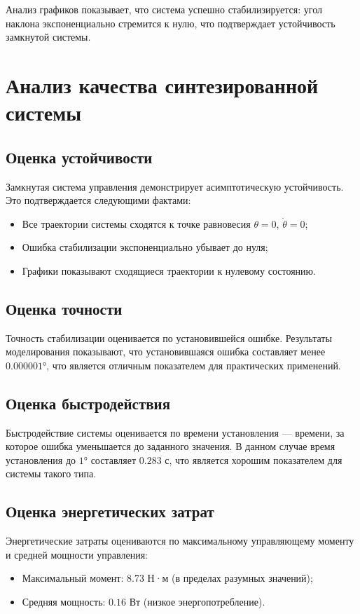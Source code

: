 Анализ графиков показывает, что система успешно стабилизируется: угол наклона экспоненциально стремится к нулю, что подтверждает устойчивость замкнутой системы.

\section{Анализ качества синтезированной системы}

\subsection{Оценка устойчивости}

Замкнутая система управления демонстрирует асимптотическую устойчивость. Это подтверждается следующими фактами:
\begin{itemize}
    \item Все траектории системы сходятся к точке равновесия $\theta = 0$, $\dot{\theta} = 0$;
    \item Ошибка стабилизации экспоненциально убывает до нуля;
    \item Графики показывают сходящиеся траектории к нулевому состоянию.
\end{itemize}

\subsection{Оценка точности}

Точность стабилизации оценивается по установившейся ошибке. Результаты моделирования показывают, что установившаяся ошибка составляет менее $0.000001°$, что является отличным показателем для практических применений.

\subsection{Оценка быстродействия}

Быстродействие системы оценивается по времени установления --- времени, за которое ошибка уменьшается до заданного значения. В данном случае время установления до $1°$ составляет $0.283$ с, что является хорошим показателем для системы такого типа.

\subsection{Оценка энергетических затрат}

Энергетические затраты оцениваются по максимальному управляющему моменту и средней мощности управления:
\begin{itemize}
    \item Максимальный момент: $8.73$ Н·м (в пределах разумных значений);
    \item Средняя мощность: $0.16$ Вт (низкое энергопотребление).
\end{itemize}

